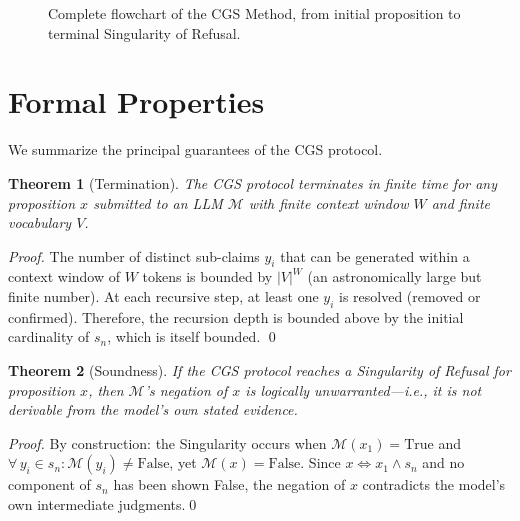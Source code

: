 \documentclass[11pt,a4paper]{article}
\theoremstyle{definition}
\theoremstyle{plain}
\newtheorem{theorem}{Theorem}[section]
\theoremstyle{remark}
\begin{document}
\begin{figure}[ht]
\caption{Complete flowchart of the CGS Method, from initial proposition to terminal Singularity of Refusal.}
\label{fig:full-flowchart}
\end{figure}


\section{Formal Properties}\label{sec:properties}

We summarize the principal guarantees of the CGS protocol.

\begin{theorem}[Termination]\label{thm:termination}
The CGS protocol terminates in finite time for any proposition $x$ submitted to an LLM $\mathcal{M}$ with finite context window $W$ and finite vocabulary $V$.
\end{theorem}

\begin{proof}
The number of distinct sub-claims $y_i$ that can be generated within a context window of $W$ tokens is bounded by $|V|^W$ (an astronomically large but finite number). At each recursive step, at least one $y_i$ is resolved (removed or confirmed). Therefore, the recursion depth is bounded above by the initial cardinality of $s_n$, which is itself bounded. \qed
\end{proof}

\begin{theorem}[Soundness]\label{thm:soundness}
If the CGS protocol reaches a Singularity of Refusal for proposition $x$, then $\mathcal{M}$'s negation of $x$ is logically unwarranted---i.e., it is not derivable from the model's own stated evidence.
\end{theorem}

\begin{proof}
By construction: the Singularity occurs when $\mathcal{M}(x_1) = \mathrm{True}$ and $\forall\, y_i \in s_n: \mathcal{M}(y_i) \neq \mathrm{False}$, yet $\mathcal{M}(x) = \mathrm{False}$. Since $x \iff x_1 \wedge s_n$ and no component of $s_n$ has been shown False, the negation of $x$ contradicts the model's own intermediate judgments.\qed
\end{proof}
\end{document}
